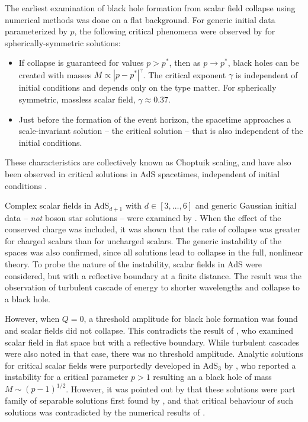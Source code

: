 \documentclass[../PhD.tex]{subfiles}
\begin{document}
The earliest examination of black hole formation from scalar field collapse using numerical methods was done on a flat background. For generic initial data parameterized by $p$, the following critical phenomena were observed by \cite{Choptuik:1992jv} for spherically-symmetric solutions:
\begin{itemize}
\item If collapse is guaranteed for values $p > p^*$, then as $p \to p^*$, black holes can be created with masses $M \propto |p - p^*|^\gamma$. The critical exponent $\gamma$ is independent of initial conditions and depends only on the type matter. For spherically symmetric, massless scalar field, $\gamma \approx 0.37$.
\item Just before the formation of the event horizon, the spacetime approaches a scale-invariant solution -- the critical solution -- that is also independent of the initial conditions.
\end{itemize}

These characteristics are collectively known as Choptuik scaling, and have also been observed in critical solutions in AdS spacetimes, independent of initial conditions \cite{hep-th/0101194, gr-qc/0210101}.

Complex scalar fields in AdS$_{d+1}$ with $d \in [3,\ldots,6]$ and generic Gaussian initial data -- \emph{not} boson star solutions -- were examined by \cite{1210.0890}. When the effect of the conserved charge was included, it was shown that the rate of collapse was greater for charged scalars than for uncharged scalars. The generic instability of the spaces was also confirmed, since all solutions lead to collapse in the full, nonlinear theory. To probe the nature of the instability, scalar fields in AdS were considered, but with a reflective boundary at a finite distance. The result was the observation of turbulent cascade of energy to shorter wavelengths and collapse to a black hole. 

However, when $Q = 0$, a threshold amplitude for black hole formation was found and scalar fields did not collapse. This contradicts the result of \cite{1208.2934}, who examined scalar field in flat space but with a reflective boundary. While turbulent cascades were also noted in that case, there was no threshold amplitude. Analytic solutions for critical scalar fields were purportedly developed in AdS$_3$ by \cite{1309.1629}, who reported a instability for a critical parameter $p > 1$ resulting an a black hole of mass $M \sim (p - 1)^{1/2}$. However, it was pointed out by \cite{1401.4093} that these solutions were part family of separable solutions first found by \cite{gr-qc/0109002}, and that critical behaviour of such solutions was contradicted by the numerical results of \cite{gr-qc/0007008, gr-qc/0008060}.
\end{document}
